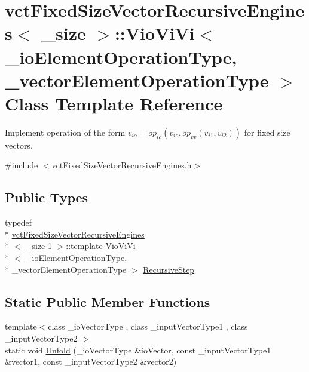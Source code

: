 \hypertarget{classvct_fixed_size_vector_recursive_engines_1_1_vio_vi_vi}{\section{vct\-Fixed\-Size\-Vector\-Recursive\-Engines$<$ \-\_\-size $>$\-:\-:Vio\-Vi\-Vi$<$ \-\_\-io\-Element\-Operation\-Type, \-\_\-vector\-Element\-Operation\-Type $>$ Class Template Reference}
\label{classvct_fixed_size_vector_recursive_engines_1_1_vio_vi_vi}
}


Implement operation of the form $v_{io} = op_{io}(v_{io}, op_{vv}(v_{i1}, v_{i2}))$ for fixed size vectors.  




{\ttfamily \#include $<$vct\-Fixed\-Size\-Vector\-Recursive\-Engines.\-h$>$}

\subsection*{Public Types}
\begin{DoxyCompactItemize}
\item 
typedef \\*
\hyperlink{classvct_fixed_size_vector_recursive_engines}{vct\-Fixed\-Size\-Vector\-Recursive\-Engines}\\*
$<$ \-\_\-size-\/1 $>$\-::template \hyperlink{classvct_fixed_size_vector_recursive_engines_1_1_vio_vi_vi}{Vio\-Vi\-Vi}\\*
$<$ \-\_\-io\-Element\-Operation\-Type, \\*
\-\_\-vector\-Element\-Operation\-Type $>$ \hyperlink{classvct_fixed_size_vector_recursive_engines_1_1_vio_vi_vi_af67bb1f70825ededcfe0b1cc9b02241b}{Recursive\-Step}
\end{DoxyCompactItemize}
\subsection*{Static Public Member Functions}
\begin{DoxyCompactItemize}
\item 
{\footnotesize template$<$class \-\_\-io\-Vector\-Type , class \-\_\-input\-Vector\-Type1 , class \-\_\-input\-Vector\-Type2 $>$ }\\static void \hyperlink{classvct_fixed_size_vector_recursive_engines_1_1_vio_vi_vi_a351dcd4f36b2105a7777ee839d239c90}{Unfold} (\-\_\-io\-Vector\-Type \&io\-Vector, const \-\_\-input\-Vector\-Type1 \&vector1, const \-\_\-input\-Vector\-Type2 \&vector2)
\end{DoxyCompactItemize}


